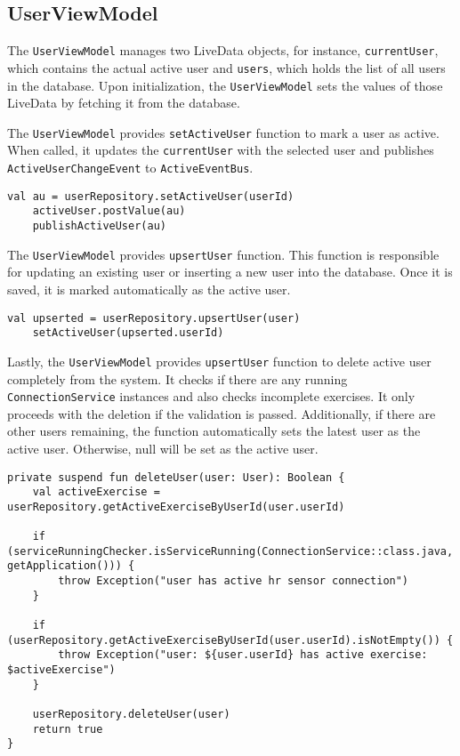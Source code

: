 \subsection{UserViewModel}
\label{chap:userviewmodel_impl}
The \texttt{UserViewModel} manages two LiveData objects, for instance, \texttt{currentUser}, which contains the actual active user and \texttt{users}, which holds the list of all users in the database. 
Upon initialization, the \texttt{UserViewModel} sets the values of those LiveData by fetching it from the database.

The \texttt{UserViewModel} provides \texttt{setActiveUser} function to mark a user as active. When called, it updates the \texttt{currentUser} with the selected user and publishes \texttt{ActiveUserChangeEvent} to \texttt{ActiveEventBus}.
\begin{lstlisting}[caption={Set active user function snippet (Kotlin - UserViewModel)}]
    val au = userRepository.setActiveUser(userId)
    activeUser.postValue(au)
    publishActiveUser(au)
\end{lstlisting}

The \texttt{UserViewModel} provides \texttt{upsertUser} function. This function is responsible for updating an existing user or inserting a new user into the database. Once it is saved, it is marked automatically as the active user.
\begin{lstlisting}[caption={Save user function snippet (Kotlin - UserViewModel)}]
    val upserted = userRepository.upsertUser(user)
    setActiveUser(upserted.userId)
\end{lstlisting}

Lastly, the \texttt{UserViewModel} provides \texttt{upsertUser} function to delete active user completely from the system.
It checks if there are any running \texttt{ConnectionService} instances and also checks incomplete exercises. 
It only proceeds with the deletion if the validation is passed. Additionally, if there are other users remaining, the function automatically sets the latest user as the active user. Otherwise, null will be set as the active user.
\begin{lstlisting}[caption={Wrapper function for user deletion (Kotlin - UserViewModel)}]
private suspend fun deleteUser(user: User): Boolean {
    val activeExercise = userRepository.getActiveExerciseByUserId(user.userId)

    if (serviceRunningChecker.isServiceRunning(ConnectionService::class.java, getApplication())) {
        throw Exception("user has active hr sensor connection")
    }

    if (userRepository.getActiveExerciseByUserId(user.userId).isNotEmpty()) {
        throw Exception("user: ${user.userId} has active exercise: $activeExercise")
    }

    userRepository.deleteUser(user)
    return true
}
\end{lstlisting}


